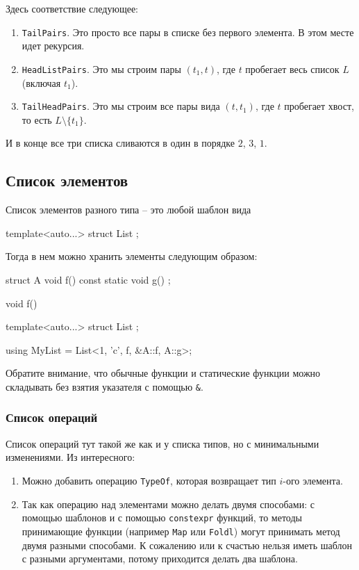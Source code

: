 Здесь соответствие следующее:
\begin{enumerate}
\item \verb"TailPairs".
Это просто все пары в списке без первого элемента.
В этом месте идет рекурсия.

\item \verb"HeadListPairs".
Это мы строим пары $(t_1, t)$, где $t$ пробегает весь список $L$ (включая $t_1$).

\item \verb"TailHeadPairs".
Это мы строим все пары вида $(t, t_1)$, где $t$ пробегает хвост, то есть $L \setminus\{t_1\}$.
\end{enumerate}
И в конце все три списка сливаются в один в порядке $2$, $3$, $1$.

\subsection{Список элементов}

Список элементов разного типа -- это любой шаблон вида
\begin{cppcode}
template<auto...>
struct List {};
\end{cppcode}
Тогда в нем можно хранить элементы следующим образом:
\begin{cppcode}
struct A {
  void f() const {
  }
  static void g() {
  }
};

void f() {
}

template<auto...>
struct List {};

using MyList = List<1, 'c', f, &A::f, A::g>;
\end{cppcode}
Обратите внимание, что обычные функции и статические функции можно складывать без взятия указателя с помощью \verb"&".

\subsubsection{Список операций}

Список операций тут такой же как и у списка типов, но с минимальными изменениями.
Из интересного:
\begin{enumerate}
\item Можно добавить операцию \verb"TypeOf", которая возвращает тип $i$-ого элемента.

\item Так как операцию над элементами можно делать двумя способами: с помощью шаблонов и с помощью \verb"constexpr" функций, то методы принимающие функции (например \verb"Map" или \verb"Foldl") могут принимать метод двумя разными способами.
К сожалению или к счастью нельзя иметь шаблон с разными аргументами, потому приходится делать два шаблона.
\end{enumerate}

